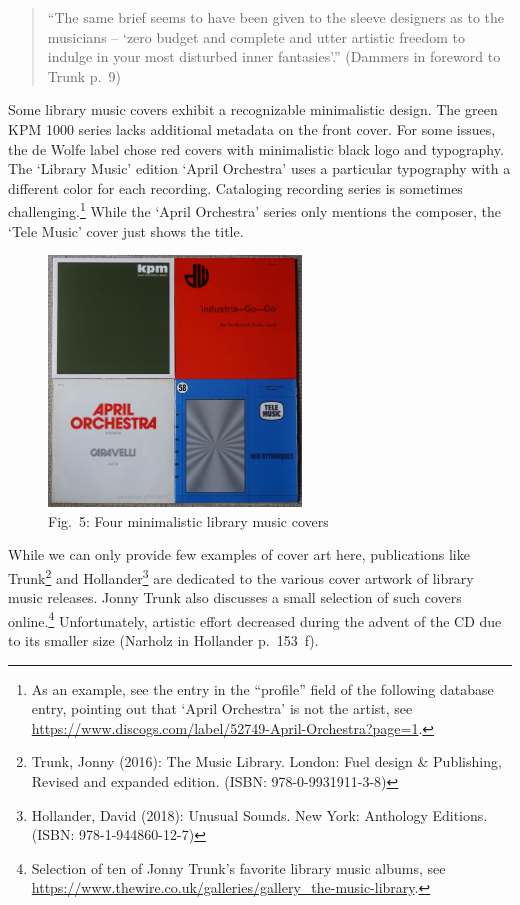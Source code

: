 \documentclass[a4paper,
fontsize=11pt,
oneside,
numbers=noperiodatend,
parskip=half-,
bibliography=totoc,
final
]{scrartcl}
\begin{document}
\begin{quote}
\enquote{The same brief seems to have been given to the sleeve designers
as to the musicians -- \enquote*{zero budget and complete and utter
artistic freedom to indulge in your most disturbed inner fantasies}.}
(Dammers in foreword to Trunk p.~9)
\end{quote}

Some library music covers exhibit a recognizable minimalistic design.
The green KPM 1000 series lacks additional metadata on the front cover.
For some issues, the de Wolfe label chose red covers with minimalistic
black logo and typography. The \enquote*{Library Music} edition
\enquote*{April Orchestra} uses a particular typography with a different
color for each recording. Cataloging recording series is sometimes
challenging.\footnote{As an example, see the entry in the
  \enquote{profile} field of the following database entry, pointing out
  that \enquote*{April Orchestra} is not the artist, see
  \url{https://www.discogs.com/label/52749-April-Orchestra?page=1}.}
While the \enquote*{April Orchestra} series only mentions the composer,
the \enquote*{Tele Music} cover just shows the title.

\begin{figure}
\centering
\includegraphics[width=0.6\textwidth]{img/Fig5.jpg}
\caption{Fig.~5: Four minimalistic library music covers}
\end{figure}

While we can only provide few examples of cover art here, publications
like Trunk\footnote{Trunk, Jonny (2016): The Music Library. London: Fuel
  design \& Publishing, Revised and expanded edition. (ISBN:
  978-0-9931911-3-8)} and Hollander\footnote{Hollander, David (2018):
  Unusual Sounds. New York: Anthology Editions. (ISBN:
  978-1-944860-12-7)} are dedicated to the various cover artwork of
library music releases. Jonny Trunk also discusses a small selection of
such covers online.\footnote{Selection of ten of Jonny Trunk's favorite
  library music albums, see
  \url{https://www.thewire.co.uk/galleries/gallery_the-music-library}.}
Unfortunately, artistic effort decreased during the advent of the CD due
to its smaller size (Narholz in Hollander p.~153~f).
\end{document}
